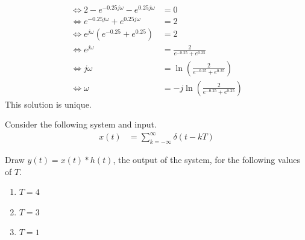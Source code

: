 \documentclass[fleqn, a4paper, 11pt, oneside]{amsart}
\theoremstyle{definition}
\theoremstyle{theorem}
\begin{document}
\begin{solution}
\begin{align*}
		\iff 2 - e^{-0.25 j \omega} - e^{0.25 j \omega}                                   & = 0                                                \\
		\iff e^{-0.25 j \omega} + e^{0.25 j \omega}                                       & = 2                                                \\
		\iff e^{j \omega} \left( e^{-0.25} + e^{0.25} \right)                             & = 2                                                \\
		\iff e^{j \omega}                                                                 & = \frac{2}{e^{-0.25} + e^{0.25}}                   \\
		\iff j \omega                                                                     & = \ln\left( \frac{2}{e^{-0.25} + e^{0.25}} \right) \\
		\iff \omega                                                                       & = -j \ln\left( \frac{2}{e^{-0.25} + e^{0.25}} \right)
	\end{align*}
	This solution is unique.
\end{solution}

\begin{question}
	Consider the following system and input.
	\begin{align*}
		x(t) & = \sum\limits_{k = -\infty}^{\infty} \delta(t - k T)
	\end{align*}
	\begin{figure}[H]
		\centering
	\end{figure}
	Draw $y(t) = x(t) \ast h(t)$, the output of the system, for the following values of $T$.
	\begin{enumerate}
		\item $T = 4$
		\item $T = 3$
		\item $T = 1$
	\end{enumerate}
\end{question}
\end{document}
